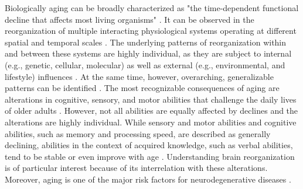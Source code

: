 
Biologically aging can be broadly characterized as "the time-dependent functional decline that affects most living organisms" \cite{López-Otín2013}. It can be observed in the reorganization of multiple interacting physiological systems operating at different spatial and temporal scales \cite{Mooney2016}. The underlying patterns of reorganization within and between these systems are highly individual, as they are subject to internal (e.g., genetic, cellular, molecular) as well as external (e.g., environmental, and lifestyle) influences \cite{Smith2020, Mooney2016, Cohen2022}. At the same time, however, overarching, generalizable patterns can be identified \cite{Salthouse2019}. The most recognizable consequences of aging are alterations in cognitive, sensory, and motor abilities that challenge the daily lives of older adults \cite{Li2002}. However, not all abilities are equally affected by declines and the alterations are highly individual. While sensory and motor abilities and cognitive abilities, such as memory and processing speed, are described as generally declining, abilities in the context of acquired knowledge, such as verbal abilities, tend to be stable or even improve with age \cite{Park2009}. Understanding brain reorganization is of particular interest because of its interrelation with these alterations. Moreover, aging is one of the major risk factors for neurodegenerative diseases \cite{Hou2019}.

